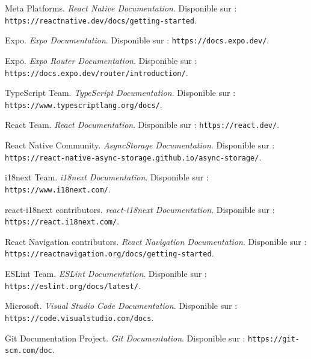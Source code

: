 \documentclass[12pt,a4paper]{report}
\begin{document}
\begin{enumerate}[label={[\arabic*]}]
\item Meta Platforms. \textit{React Native Documentation}. Disponible sur : \texttt{https://reactnative.dev/docs/getting-started}.

\item Expo. \textit{Expo Documentation}. Disponible sur : \texttt{https://docs.expo.dev/}.

\item Expo. \textit{Expo Router Documentation}. Disponible sur : \texttt{https://docs.expo.dev/router/introduction/}.

\item TypeScript Team. \textit{TypeScript Documentation}. Disponible sur : \texttt{https://www.typescriptlang.org/docs/}.

\item React Team. \textit{React Documentation}. Disponible sur : \texttt{https://react.dev/}.

\item React Native Community. \textit{AsyncStorage Documentation}. Disponible sur : \texttt{https://react-native-async-storage.github.io/async-storage/}.

\item i18next Team. \textit{i18next Documentation}. Disponible sur : \texttt{https://www.i18next.com/}.

\item react-i18next contributors. \textit{react-i18next Documentation}. Disponible sur : \texttt{https://react.i18next.com/}.

\item React Navigation contributors. \textit{React Navigation Documentation}. Disponible sur : \texttt{https://reactnavigation.org/docs/getting-started}.

\item ESLint Team. \textit{ESLint Documentation}. Disponible sur : \texttt{https://eslint.org/docs/latest/}.

\item Microsoft. \textit{Visual Studio Code Documentation}. Disponible sur : \texttt{https://code.visualstudio.com/docs}.

\item Git Documentation Project. \textit{Git Documentation}. Disponible sur : \texttt{https://git-scm.com/doc}.
\end{enumerate}
\end{document}
